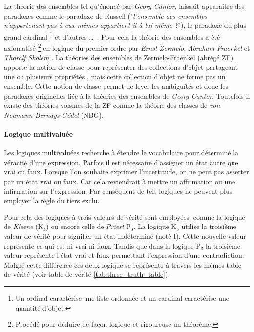 \begin{refsegment}
\begin{shadedfigure}
    \end{shadedfigure}

    La théorie des ensembles tel qu'énoncé par \textit{Georg Cantor}, laissait apparaître des paradoxes comme le paradoxe de Russell ("\textit{l'ensemble des ensembles n'appartenant pas à eux-mêmes appartient-il à lui-même ?}"), le paradoxe du plus grand cardinal \footnote{Un ordinal caractérise une liste ordonnée et un cardinal caractérise une quantité d'objet.} et d'autres \ldots~. Pour cela la théorie des ensembles a été axiomatisé \footnote{Procédé pour déduire de façon logique et rigoureuse un théorème.} en logique du premier ordre par \textit{Ernst Zermelo}, \textit{ Abraham Fraenkel} et \textit{Thoralf Skolem} \cite{hayden1968zermelo,kanamori2008higher}. La théories des ensembles de Zermelo-Fraenkel (abrégé ZF) apporte la notion de classe pour représenter des collections d'objet partageant une ou plusieurs propriétés , mais cette collection d'objet ne forme pas un ensemble. Cette notion de classe permet de lever les ambiguïtés et donc les paradoxes originelles liée à la théories des ensembles de \textit{Georg Cantor}. Toutefois il existe des théories voisines de la ZF comme la théorie des classes \cite{bernays1937system,van1967frege} de \textit{von Neumann-Bernays-Gödel} (NBG).

        
    \paragraph{Logique multivaluée}
    
    Les logiques multivaluées recherche à étendre le vocabulaire pour déterminé la véracité d'une expression. Parfois il est nécessaire d'assigner un état autre que vrai ou faux. Lorsque l'on souhaite exprimer l'incertitude, on ne peut pas asserter par un état vrai ou faux. Car cela reviendrait à mettre un affirmation ou une infirmation sur l'expression. Par conséquent de tels logiques ne peuvent plus employer la règle du tiers exclu.
    
    Pour cela des logiques à trois valeurs de vérité sont employées, comme la logique de \textit{Kleene} (K$_{3}$) ou encore celle de \textit{Priest} P$_{3}$. La logique K$_{3}$ utilise la troisième valeur de vérité pour signifier un état indéterminé (noté I).  Cette nouvelle valeur représente ce qui est ni vrai ni faux.  Tandis que dans la logique P$_{3}$ la troisième valeur représente l'état vrai et faux permettant l'expression d'une contradiction. Malgré cette différence ces deux logique se représente à travers les mêmes table de vérité (voir table de vérité \ref{tab:three_truth_table}).
    

\end{refsegment}
